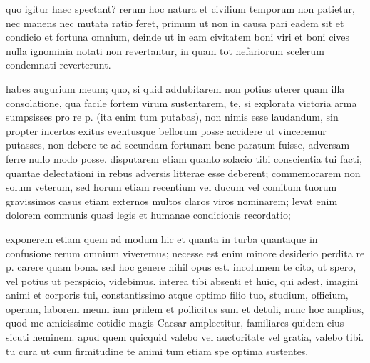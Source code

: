  quo igitur haec spectant? rerum hoc natura et civilium temporum non patietur, nec manens nec mutata ratio feret, primum ut non in causa pari eadem sit et condicio et fortuna omnium, deinde ut in eam civitatem boni viri et boni cives nulla ignominia notati non revertantur, in quam tot nefariorum scelerum condemnati reverterunt.

 habes augurium meum; quo, si quid addubitarem non potius uterer quam illa consolatione, qua facile fortem virum sustentarem, te, si explorata victoria arma sumpsisses pro re p. (ita enim tum putabas), non nimis esse laudandum, sin propter incertos exitus eventusque bellorum posse accidere ut vinceremur putasses, non debere te ad secundam fortunam bene paratum fuisse, adversam ferre nullo modo posse. disputarem etiam quanto solacio tibi conscientia tui facti, quantae delectationi in rebus adversis litterae esse deberent; commemorarem non solum veterum, sed horum etiam recentium vel ducum vel comitum tuorum gravissimos casus etiam externos multos claros viros nominarem; levat enim dolorem communis quasi legis et humanae condicionis recordatio;

 exponerem etiam quem ad modum hic et quanta in turba quantaque in confusione rerum omnium viveremus; necesse est enim minore desiderio perdita re p. carere quam bona. sed hoc genere nihil opus est. incolumem te cito, ut spero, vel potius ut perspicio, videbimus. interea tibi absenti et huic, qui adest, imagini animi et corporis tui, constantissimo atque optimo filio tuo, studium, officium, operam, laborem meum iam pridem et pollicitus sum et detuli, nunc hoc amplius, quod me amicissime cotidie magis Caesar amplectitur, familiares quidem eius sicuti neminem. apud quem quicquid valebo vel auctoritate vel gratia, valebo tibi. tu cura ut cum firmitudine te animi tum etiam spe optima sustentes.
